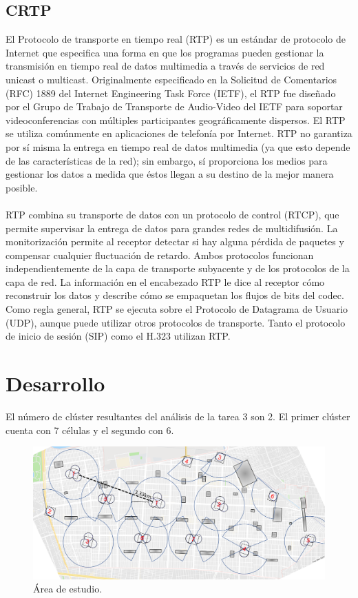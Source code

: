 \documentclass[11pt,letterpaper]{article}
\begin{document}
\subsection{CRTP}
El Protocolo de transporte en tiempo real (RTP) es un estándar de protocolo de Internet 
que especifica una forma en que los programas pueden gestionar la transmisión en tiempo 
real de datos multimedia a través de servicios de red unicast o multicast. Originalmente 
especificado en la Solicitud de Comentarios (RFC) 1889 del Internet Engineering Task 
Force (IETF), el RTP fue diseñado por el Grupo de Trabajo de Transporte de Audio-Video 
del IETF para soportar videoconferencias con múltiples participantes geográficamente 
dispersos. El RTP se utiliza comúnmente en aplicaciones de telefonía por Internet. RTP 
no garantiza por sí misma la entrega en tiempo real de datos multimedia (ya que esto 
depende de las características de la red); sin embargo, sí proporciona los medios para 
gestionar los datos a medida que éstos llegan a su destino de la mejor manera posible.
\\ \\
RTP combina su transporte de datos con un protocolo de control (RTCP), que permite 
supervisar la entrega de datos para grandes redes de multidifusión. La monitorización 
permite al receptor detectar si hay alguna pérdida de paquetes y compensar cualquier 
fluctuación de retardo. Ambos protocolos funcionan independientemente de la capa de 
transporte subyacente y de los protocolos de la capa de red. La información en el 
encabezado RTP le dice al receptor cómo reconstruir los datos y describe cómo se 
empaquetan los flujos de bits del codec. Como regla general, RTP se ejecuta sobre el 
Protocolo de Datagrama de Usuario (UDP), aunque puede utilizar otros protocolos de 
transporte. Tanto el protocolo de inicio de sesión (SIP) como el H.323 utilizan RTP.

\newpage
\section{Desarrollo}
El número de clúster resultantes del análisis de la tarea 3 son 2. El primer clúster 
cuenta con 7 células y el segundo con 6.

\begin{figure}[ht]
    \centering
    \includegraphics[width=.95\textwidth]{imagenes/t50.png}
    \caption{Área de estudio.}
\end{figure}
\end{document}
